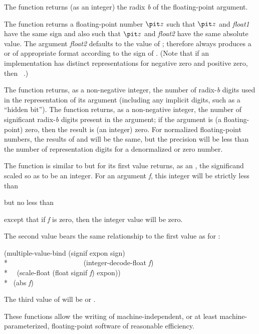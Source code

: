 \begin{defun}[Function]
The function  returns (as an integer)
the radix {\it b} of the floating-point argument.

The function  returns a floating-point number ${\it z}$ such
that ${\it z}$ and {\it float1} have the same sign and also such that
${\it z}$ and {\it float2} have the same absolute value.
The argument {\it float2} defaults to the value of ;
 therefore always produces a  or 
of appropriate format
according to the sign of .  (Note that if an implementation
has distinct representations for negative zero and positive zero,
then  \EV\ .)

The function  returns, as a non-negative integer,
the number of radix-{\it b} digits
used in the representation of its argument (including any implicit
digits, such as a ``hidden bit'').
The function 
returns, as a non-negative integer,
the number of significant radix-{\it b} digits present in the
argument; if the argument is (a floating-point)
zero, then the result is (an integer) zero.
For normalized floating-point numbers, the results of 
and 
will be the same, but the precision will be less than the
number of representation digits for a denormalized or zero number.

The function  is similar to 
but for its first value returns,
as an , the significand scaled so as to be an integer.
For an argument {\it f}, this integer will be strictly less than
\begin{lisp}
\end{lisp}
but no less than
\begin{lisp}
\end{lisp}
except that if {\it f} is zero, then the integer value will be zero.

The second value bears the same relationship to the first value
as for :
\begin{lisp}
(multiple-value-bind (signif expon sign) \\*
~~~~~~~~~~~~~~~~~~~~~(integer-decode-float {\it f}) \\*
~~(scale-float (float signif {\it f}) expon)) \\*
\EQ\ (abs {\it f})
\end{lisp}

The third value of  will be  or .

\beforenoterule
\begin{rationale}
These functions allow the writing of machine-independent,
or at least machine-parameterized, floating-point software of reasonable
efficiency.
\end{rationale}
\afternoterule
\end{defun}

